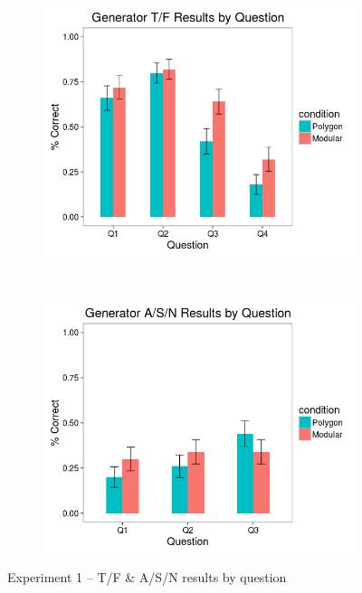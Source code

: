 \documentclass[man,mask,10pt]{apa6}
\begin{document}
\begin{figure}[H]
\centering
\begin{subfigure}[c]{0.45\textwidth}
\centering
\includegraphics[width=\textwidth]{figures/1/gen_TF_by_Q.png}
\end{subfigure}
~
\begin{subfigure}[c]{0.45\textwidth}
\centering
\includegraphics[width=\textwidth]{figures/1/gen_ASN_by_Q.png}
\end{subfigure}
\caption{Experiment 1 -- T/F \& A/S/N results by question}
\end{figure}\noindent 
\end{document}
